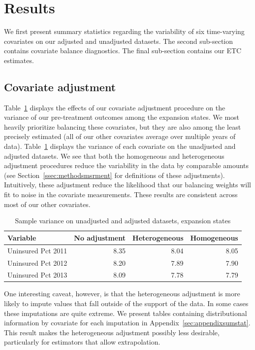 \documentclass[aoas]{imsart}
\theoremstyle{plain}
\theoremstyle{remark}
\begin{document}
\section{Results}\label{sec:results}

We first present summary statistics regarding the variability of six time-varying covariates on our adjusted and unadjusted datasets. The second sub-section contains covariate balance diagnostics. The final sub-section contains our ETC estimates.

\subsection{Covariate adjustment}

Table~\ref{tab:adjust1} displays the effects of our covariate adjustment procedure on the variance of our pre-treatment outcomes among the expansion states. We most heavily prioritize balancing these covariates, but they are also among the least precisely estimated (all of our other covariates average over multiple years of data). Table~\ref{tab:adjust1} displays the variance of each covariate on the unadjusted and adjusted datasets. We see that both the homogeneous and heterogeneous adjustment procedures reduce the variability in the data by comparable amounts (see Section~\ref{ssec:methodsmsrment} for definitions of these adjustments). Intuitively, these adjustment reduce the likelihood that our balancing weights will fit to noise in the covariate measurements. These results are consistent across most of our other covariates.

\begin{table}[ht]
\caption{Sample variance on unadjusted and adjusted datasets, expansion states}\label{tab:adjust1}
\begin{tabular}{lrrr}
  \hline
Variable & No adjustment & Heterogeneous & Homogeneous \\ 
  \hline
Uninsured Pct 2011 & 8.35 & 8.04 & 8.05 \\ 
  Uninsured Pct 2012 & 8.20 & 7.89 & 7.90 \\ 
  Uninsured Pct 2013 & 8.09 & 7.78 & 7.79 \\ 
   \hline
\end{tabular}
\end{table}

One interesting caveat, however, is that the heterogeneous adjustment is more likely to impute values that fall outside of the support of the data. In some cases these imputations are quite extreme. We present tables containing distributional information by covariate for each imputation in Appendix~\ref{sec:appendixsumstat}. This result makes the heterogeneous adjustment possibly less desirable, particularly for estimators that allow extrapolation.
\end{document}

